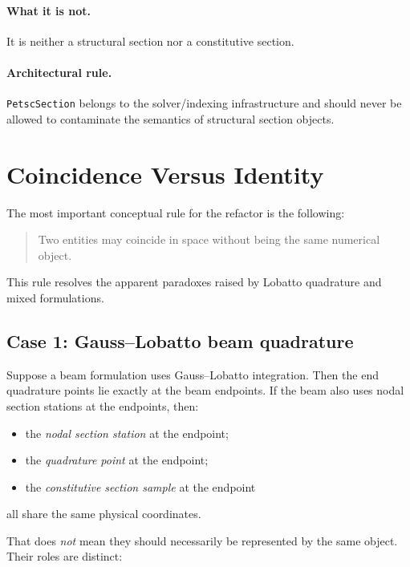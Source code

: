 \paragraph{What it is not.}
It is neither a structural section nor a constitutive section.

\paragraph{Architectural rule.}
\texttt{PetscSection} belongs to the solver/indexing infrastructure and should
never be allowed to contaminate the semantics of structural section objects.


\section{Coincidence Versus Identity}
\label{sec:domain-ontology-coincidence}

The most important conceptual rule for the refactor is the following:

\begin{quote}
Two entities may coincide in space without being the same numerical object.
\end{quote}

This rule resolves the apparent paradoxes raised by Lobatto quadrature and
mixed formulations.

\subsection{Case 1: Gauss--Lobatto beam quadrature}

Suppose a beam formulation uses Gauss--Lobatto integration.  Then the end
quadrature points lie exactly at the beam endpoints.  If the beam also uses
nodal section stations at the endpoints, then:

\begin{itemize}[nosep]
  \item the \emph{nodal section station} at the endpoint;
  \item the \emph{quadrature point} at the endpoint;
  \item the \emph{constitutive section sample} at the endpoint
\end{itemize}

all share the same physical coordinates.

That does \emph{not} mean they should necessarily be represented by the same
object.  Their roles are distinct:

